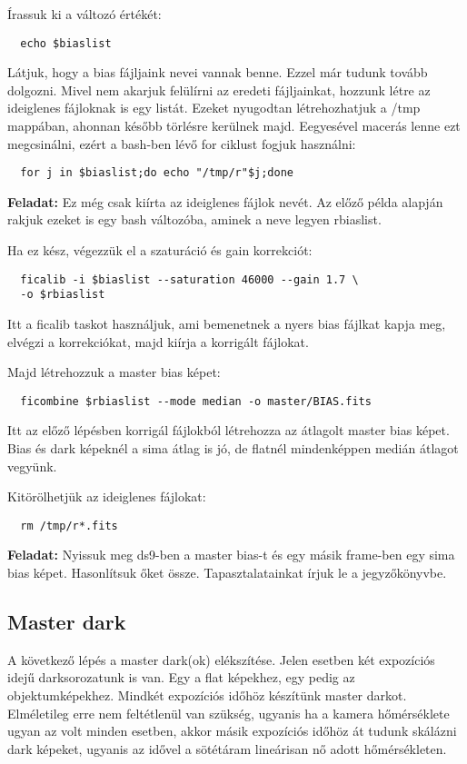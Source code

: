 \documentclass{article}
\begin{document}
Írassuk ki a változó értékét:
\begin{verbatim}
  echo $biaslist
\end{verbatim}

Látjuk, hogy a bias fájljaink nevei vannak benne. Ezzel már tudunk tovább
dolgozni.
Mivel nem akarjuk felülírni az eredeti fájljainkat, hozzunk létre az ideiglenes
fájloknak is egy listát. Ezeket nyugodtan létrehozhatjuk a /tmp mappában,
ahonnan később törlésre kerülnek majd.
Eegyesével macerás lenne ezt megcsinálni, ezért a bash-ben lévő for ciklust
fogjuk használni:

\begin{verbatim}
  for j in $biaslist;do echo "/tmp/r"$j;done
\end{verbatim}

{\bf Feladat:}
Ez még csak kiírta az ideiglenes fájlok nevét. Az előző példa alapján rakjuk
ezeket is egy bash változóba, aminek a neve legyen rbiaslist.

Ha ez kész, végezzük el a szaturáció és gain korrekciót:
\begin{verbatim}
  ficalib -i $biaslist --saturation 46000 --gain 1.7 \
  -o $rbiaslist
\end{verbatim}

Itt a ficalib taskot használjuk, ami bemenetnek a nyers bias fájlkat kapja meg,
elvégzi a korrekciókat, majd kiírja a korrigált fájlokat.

Majd létrehozzuk a master bias képet:
\begin{verbatim}
  ficombine $rbiaslist --mode median -o master/BIAS.fits
\end{verbatim}

Itt az előző lépésben korrigál fájlokból létrehozza az átlagolt master bias
képet. Bias és dark képeknél a sima átlag is jó, de flatnél mindenképpen medián
átlagot vegyünk.

Kitörölhetjük az ideiglenes fájlokat:
\begin{verbatim}
  rm /tmp/r*.fits
\end{verbatim}

{\bf Feladat:}
Nyissuk meg ds9-ben a master bias-t és egy másik frame-ben egy sima bias képet.
Hasonlítsuk őket össze. Tapasztalatainkat írjuk le a jegyzőkönyvbe.

\subsection{Master dark}

A következő lépés a master dark(ok) elékszítése. Jelen esetben két expozíciós
idejű darksorozatunk is van. Egy a flat képekhez, egy pedig az objektumképekhez.
Mindkét expozíciós időhöz készítünk master darkot. Elméletileg erre nem
feltétlenül van szükség, ugyanis ha a kamera hőmérséklete ugyan az volt minden
esetben, akkor másik expozíciós időhöz át tudunk skálázni dark képeket, ugyanis
az idővel a sötétáram lineárisan nő adott hőmérsékleten.
\end{document}
